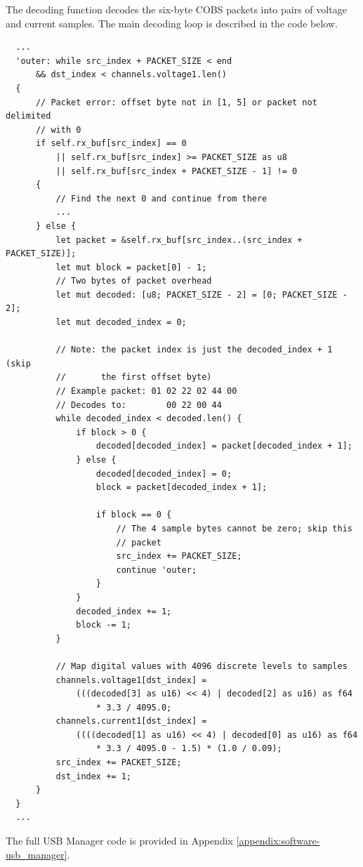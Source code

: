 \documentclass[letterpaper,11pt]{article}
\begin{document}
The decoding function decodes the six-byte COBS packets into pairs of voltage
and current samples. The main decoding loop is described in the code below.

\begin{verbatim}
  ...
  'outer: while src_index + PACKET_SIZE < end
      && dst_index < channels.voltage1.len()
  {
      // Packet error: offset byte not in [1, 5] or packet not delimited
      // with 0
      if self.rx_buf[src_index] == 0
          || self.rx_buf[src_index] >= PACKET_SIZE as u8
          || self.rx_buf[src_index + PACKET_SIZE - 1] != 0
      {
          // Find the next 0 and continue from there
          ...
      } else {
          let packet = &self.rx_buf[src_index..(src_index + PACKET_SIZE)];
          let mut block = packet[0] - 1;
          // Two bytes of packet overhead
          let mut decoded: [u8; PACKET_SIZE - 2] = [0; PACKET_SIZE - 2];
          let mut decoded_index = 0;

          // Note: the packet index is just the decoded_index + 1 (skip
          //       the first offset byte)
          // Example packet: 01 02 22 02 44 00
          // Decodes to:        00 22 00 44
          while decoded_index < decoded.len() {
              if block > 0 {
                  decoded[decoded_index] = packet[decoded_index + 1];
              } else {
                  decoded[decoded_index] = 0;
                  block = packet[decoded_index + 1];

                  if block == 0 {
                      // The 4 sample bytes cannot be zero; skip this
                      // packet
                      src_index += PACKET_SIZE;
                      continue 'outer;
                  }
              }
              decoded_index += 1;
              block -= 1;
          }

          // Map digital values with 4096 discrete levels to samples
          channels.voltage1[dst_index] =
              (((decoded[3] as u16) << 4) | decoded[2] as u16) as f64
                  * 3.3 / 4095.0;
          channels.current1[dst_index] =
              ((((decoded[1] as u16) << 4) | decoded[0] as u16) as f64
                  * 3.3 / 4095.0 - 1.5) * (1.0 / 0.09);
          src_index += PACKET_SIZE;
          dst_index += 1;
      }
  }
  ...
\end{verbatim}

The full USB Manager code is provided in Appendix \ref{appendix:software-usb_manager}.
\end{document}
